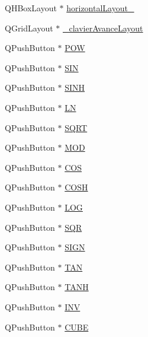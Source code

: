 \begin{DoxyCompactItemize}
\item 
\-Q\-H\-Box\-Layout $\ast$ \hyperlink{class_ui___main_window_a03ce63974cc69b067c91bbf285cceca8}{horizontal\-Layout\-\_}
\item 
\-Q\-Grid\-Layout $\ast$ \hyperlink{class_ui___main_window_ab1a8b1e5dea7cdd088cef57264356e0b}{\-\_\-clavier\-Avance\-Layout}
\item 
\-Q\-Push\-Button $\ast$ \hyperlink{class_ui___main_window_a02bdc78125dfec5dfb5653ce0776eeb3}{\-P\-O\-W}
\item 
\-Q\-Push\-Button $\ast$ \hyperlink{class_ui___main_window_ac1caf33332e6d63e4ec1a9071713493b}{\-S\-I\-N}
\item 
\-Q\-Push\-Button $\ast$ \hyperlink{class_ui___main_window_a22cb4dc418e7679c26754c84c1529a29}{\-S\-I\-N\-H}
\item 
\-Q\-Push\-Button $\ast$ \hyperlink{class_ui___main_window_a62e9dca715645175577d6143bc93fd9f}{\-L\-N}
\item 
\-Q\-Push\-Button $\ast$ \hyperlink{class_ui___main_window_a6e35980b83db49bf01e02faf128a8ba4}{\-S\-Q\-R\-T}
\item 
\-Q\-Push\-Button $\ast$ \hyperlink{class_ui___main_window_a8340a7d6e9beca550e886c360dbc7afb}{\-M\-O\-D}
\item 
\-Q\-Push\-Button $\ast$ \hyperlink{class_ui___main_window_acba7c9022bfdd86ca0513771138d1f79}{\-C\-O\-S}
\item 
\-Q\-Push\-Button $\ast$ \hyperlink{class_ui___main_window_ab6f966dfd75b5b8164555868f5331ada}{\-C\-O\-S\-H}
\item 
\-Q\-Push\-Button $\ast$ \hyperlink{class_ui___main_window_a47f156cd397be49d22f6f7fe15b0fde4}{\-L\-O\-G}
\item 
\-Q\-Push\-Button $\ast$ \hyperlink{class_ui___main_window_a6259c463080f8ffe0be91053e874780b}{\-S\-Q\-R}
\item 
\-Q\-Push\-Button $\ast$ \hyperlink{class_ui___main_window_a5a851ab1cd3ae5dac5d8cf6b6e22e956}{\-S\-I\-G\-N}
\item 
\-Q\-Push\-Button $\ast$ \hyperlink{class_ui___main_window_a17184ec702aa5040677142c4a143e5f2}{\-T\-A\-N}
\item 
\-Q\-Push\-Button $\ast$ \hyperlink{class_ui___main_window_aa0b74bbccda6715c999c78240332fda0}{\-T\-A\-N\-H}
\item 
\-Q\-Push\-Button $\ast$ \hyperlink{class_ui___main_window_a8f44a583b70486ec7584db651ddc3fa6}{\-I\-N\-V}
\item 
\-Q\-Push\-Button $\ast$ \hyperlink{class_ui___main_window_a6808a4c8810a4b54cdcfc0def3b69e4c}{\-C\-U\-B\-E}

\end{DoxyCompactItemize}
